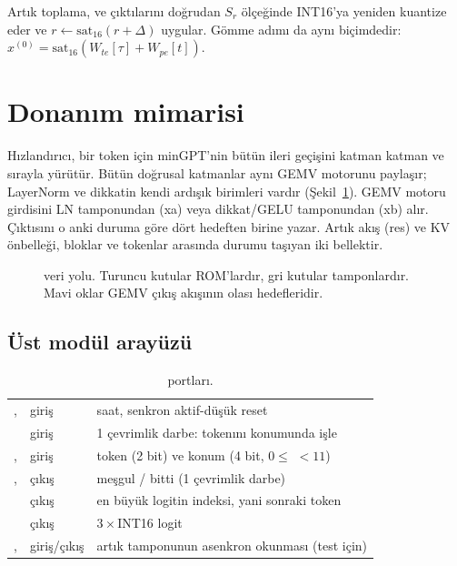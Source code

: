 Artık toplama,  ve  çıktılarını doğrudan $S_r$ ölçeğinde INT16'ya yeniden kuantize eder ve $r \leftarrow \mathrm{sat}_{16}(r + \Delta)$ uygular. Gömme adımı da aynı biçimdedir: $x^{(0)} = \mathrm{sat}_{16}(W_{te}[\tau] + W_{pe}[t])$.

\section{Donanım mimarisi}\label{sec:mimari}

Hızlandırıcı, bir token için minGPT'nin bütün ileri geçişini katman katman ve sırayla yürütür. Bütün doğrusal katmanlar aynı GEMV motorunu paylaşır; LayerNorm ve dikkatin kendi ardışık birimleri vardır (Şekil~\ref{fig:mimari}). GEMV motoru girdisini LN tamponundan (xa) veya dikkat/GELU tamponundan (xb) alır. Çıktısını o anki duruma göre dört hedeften birine yazar. Artık akış (res) ve KV önbelleği, bloklar ve tokenlar arasında durumu taşıyan iki bellektir.

\begin{figure}[h]
  \centering
  \caption[ veri yolu]{ veri yolu. Turuncu kutular ROM'lardır, gri kutular tamponlardır. Mavi oklar GEMV çıkış akışının olası hedefleridir.}
  \label{fig:mimari}
\end{figure}

\subsection{Üst modül arayüzü}

\begin{table}[h]
  \centering\small
  \caption{ portları.}
  \label{tab:portlar}
  \begin{tabularx}{\textwidth}{@{}llL@{}}
    \toprule
     &  &  \\ \midrule
    ,  & giriş & saat, senkron aktif-düşük reset \\
     & giriş & 1 çevrimlik darbe:  tokenını  konumunda işle \\
    ,  & giriş & token (2 bit) ve konum (4 bit, $0 \le$  $< 11$) \\
    ,  & çıkış & meşgul / bitti (1 çevrimlik darbe) \\
     & çıkış & en büyük logitin indeksi, yani sonraki token \\
     & çıkış & $3\times$INT16 logit \\
    ,  & giriş/çıkış & artık tamponunun asenkron okunması (test için) \\ \bottomrule
  \end{tabularx}
\end{table}

